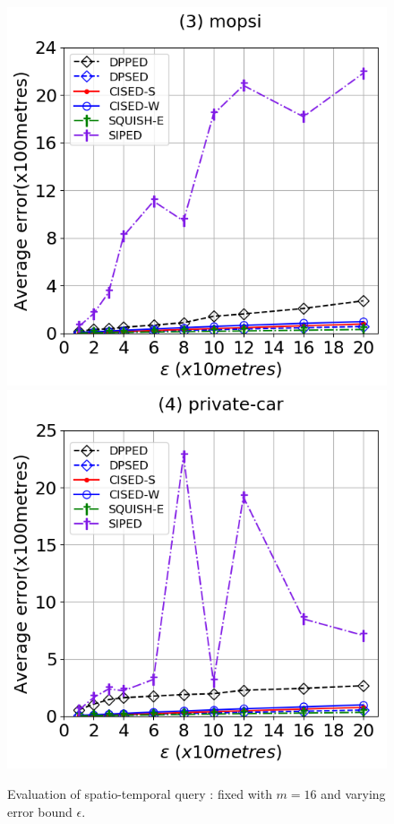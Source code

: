 {\begin{figure}[tb!]
\includegraphics[scale = 0.290]{Figures/Exp-query-ae-epsilon-mopsi.png}\hspace{1ex}
\includegraphics[scale = 0.290]{Figures/Exp-query-ae-epsilon-private.png}
\caption{\small Evaluation of spatio-temporal query : fixed with $m=16$ and varying error bound $\epsilon$.}
\label{fig:query-ae}
\end{figure}


}
